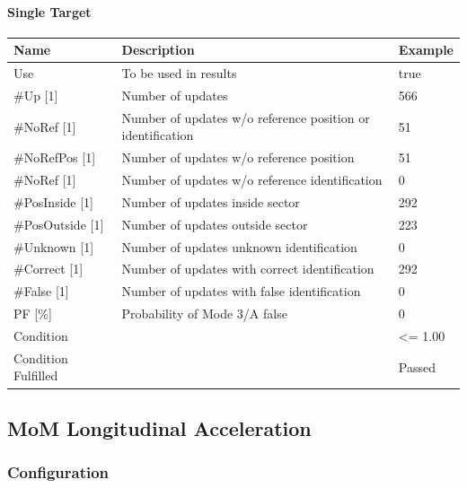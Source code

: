 \paragraph{Single Target}

\begin{center}
 \begin{table}[H]
  \begin{tabularx}{\textwidth}{ | l | X |  l | }
    \hline
    \textbf{Name} & \textbf{Description} & \textbf{Example} \\ \hline
    Use & To be used in results & true \\ \hline
    \#Up [1] & Number of updates & 566 \\ \hline
    \#NoRef [1] & Number of updates w/o reference position or identification & 51 \\ \hline
    \#NoRefPos [1] & Number of updates w/o reference position  & 51 \\ \hline
    \#NoRef [1] & Number of updates w/o reference identification & 0 \\ \hline
    \#PosInside [1] & Number of updates inside sector & 292 \\ \hline
    \#PosOutside [1] & Number of updates outside sector & 223 \\ \hline
    \#Unknown [1] & Number of updates unknown identification & 0 \\ \hline
    \#Correct [1] & Number of updates with correct identification & 292 \\ \hline
    \#False [1] & Number of updates with false identification & 0 \\ \hline
    PF [\%] & Probability of Mode 3/A false & 0 \\ \hline
    Condition &  & <= 1.00 \\ \hline
    Condition Fulfilled &  & Passed \\ \hline
\end{tabularx}
\end{table}
\end{center}

\subsection{MoM Longitudinal Acceleration}
\label{sec:eval_req_mom_long}

\subsubsection{Configuration}

